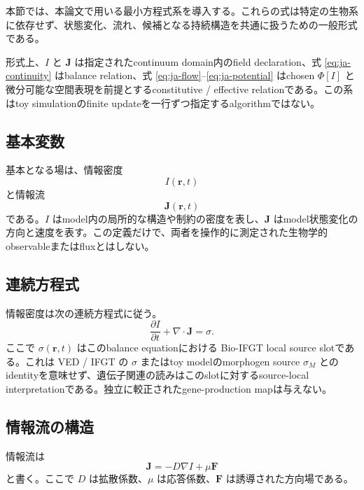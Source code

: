 \documentclass[11pt]{ltjsarticle}
\newcommand{\I}{I}
\newcommand{\J}{\mathbf{J}}
\newcommand{\PhiI}{\Phi}
\begin{document}
本節では、本論文で用いる最小方程式系を導入する。これらの式は特定の生物系に依存せず、状態変化、流れ、候補となる持続構造を共通に扱うための一般形式である。

形式上、\(\I\) と \(\J\) は指定されたcontinuum domain内のfield declaration、式 \eqref{eq:ja-continuity} はbalance relation、式 \eqref{eq:ja-flow}--\eqref{eq:ja-potential} はchosen \(\PhiI[\I]\) と微分可能な空間表現を前提とするconstitutive / effective relationである。この系はtoy simulationのfinite updateを一行ずつ指定するalgorithmではない。

\subsection{基本変数}

基本となる場は、情報密度
\begin{equation}
  \I(\mathbf{r},t)
\end{equation}
と情報流
\begin{equation}
  \J(\mathbf{r},t)
\end{equation}
である。\(\I\) はmodel内の局所的な構造や制約の密度を表し、\(\J\) はmodel状態変化の方向と速度を表す。この定義だけで、両者を操作的に測定された生物学的observableまたはfluxとはしない。

\subsection{連続方程式}

情報密度は次の連続方程式に従う。
\begin{equation}
  \frac{\partial \I}{\partial t}+\nabla\cdot\J=\sigma .
  \label{eq:ja-continuity}
\end{equation}
ここで \(\sigma(\mathbf{r},t)\) はこのbalance equationにおける Bio-IFGT local source slotである。これは VED / IFGT の \(\sigma\) またはtoy modelのmorphogen source \(\sigma_M\) とのidentityを意味せず、遺伝子関連の読みはこのslotに対するsource-local interpretationである。独立に較正されたgene-production mapは与えない。

\subsection{情報流の構造}

情報流は
\begin{equation}
  \J=-D\nabla \I+\mu\mathbf{F}
  \label{eq:ja-flow}
\end{equation}
と書く。ここで \(D\) は拡散係数、\(\mu\) は応答係数、\(\mathbf{F}\) は誘導された方向場である。
\end{document}
